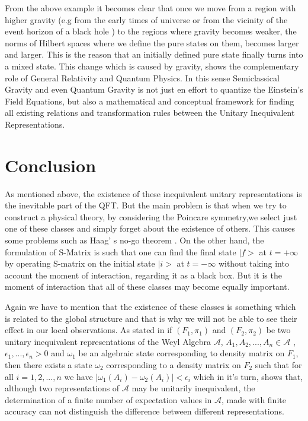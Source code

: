 \documentclass[12pt]{article}
\begin{document}
From the  above example it becomes clear that once we move from a region with higher gravity (e.g from the early times of universe or from the vicinity of the event horizon of a black hole ) to the regions where gravity becomes weaker, the norms of Hilbert spaces where we define the pure states on them, becomes larger and larger. This is the reason that an initially defined pure state finally turns into a mixed state. This change which is caused by gravity, shows the complementary role of General Relativity and Quantum Physics. In this sense Semiclassical Gravity and even Quantum Gravity is not just en effort to quantize the Einstein's Field Equations, but also a mathematical and conceptual framework for finding all existing relations and transformation rules between the Unitary Inequivalent Representations. 






\section{Conclusion}\label{section.conclusion}
As mentioned above, the existence of these inequivalent unitary representations is the inevitable part of the QFT. But the main problem is that when we try to construct a physical theory, by considering the Poincare symmetry,we select just one of these classes and simply forget about the existence of others. This causes some problems such as Haag' s no-go theorem \cite{HaagArt}. On the other hand, the formulation of S-Matrix is such that one can find the final state $|f>$ at $t=+\infty$ by operating S-matrix on the initial state $|i>$ at $t=-\infty$ without taking into account the moment of interaction, regarding it as a black box. But it is the moment of interaction that all of these classes may become equally important.

Again we have to mention that the existence of these classes is something which is related to the global structure and that is why we will not be able to see their effect  in our local observations. As stated in \cite{Wald} if $(F_1,\pi_1)$ and $ (F_2,\pi_2)$ be two unitary inequivalent representations of the Weyl Algebra $\mathcal{A}$, $A_1,A_2,...,A_n \in \mathcal{A}$ , $\epsilon_1, ... ,\epsilon_n >0$ and $\omega_1$ be an algebraic state corresponding to density matrix on $F_1$, then there exists a state $\omega_2$ corresponding to a density matrix on $F_2$ such that for all $i=1,2,...,n$ we have $|\omega_1(A_i)-\omega_2(A_i)|<\epsilon_i$ which in it's turn, shows that, although two representations of $\mathcal{A}$ may be unitarily inequivalent, the determination of a finite number of expectation values in $\mathcal{A}$, made with finite accuracy can not distinguish the difference between different representations.
\end{document}
